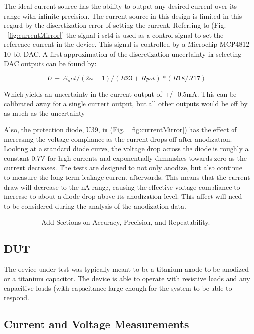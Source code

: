 \documentclass[journal]{IEEEtran}
\begin{document}
The ideal current source has the ability to output any desired current over its range with infinite precision. The current source in this design is limited in this regard by the discretization error of setting the current. Referring to (Fig. ~\ref{fig:currentMirror}) the signal i set4 is used as a control signal to set the reference current in the device. This signal is controlled by a Microchip MCP4812 10-bit DAC. A first approximation of the discretization uncertainty in selecting DAC outputs can be found by:


\begin{equation}
U = Vi_set /(2n-1) / (R23 + Rpot) *(R18/R17)
\end{equation}

Which yields an uncertainty in the current output of +/- 0.5mA. This can be calibrated away for a single current output, but all other outputs would be off by as much as the uncertainty.

Also, the protection diode, U39, in (Fig. ~\ref{fig:currentMirror}) has the effect of increasing the voltage compliance as the current drops off after anodization. Looking at a standard diode curve, the voltage drop across the diode is roughly a constant 0.7V for high currents and exponentially diminishes towards zero as the current decreases. The tests are designed to not only anodize, but also continue to measure the long-term leakage current afterwards. This means that the current draw will decrease to the nA range, causing the effective voltage compliance to increase to about a diode drop above its anodization level. This affect will need to be considered during the analysis of the anodization data.

-----------------Add Sections on Accuracy, Precision, and Repeatability. 

\subsection{DUT}

The device under test was typically meant to be a titanium anode to be anodized or a titanium capacitor. The device is able to operate with resistive loads and any capacitive loads (with capacitance large enough for the system to be able to respond.


\subsection{Current and Voltage Measurements}
\end{document}
